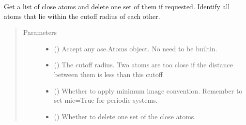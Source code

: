\documentclass[letterpaper,10pt,english]{sphinxmanual}
\begin{document}
\begin{fulllineitems}
\label{\detokenize{utilities:acat.utilities.get_close_atoms}}
Get a list of close atoms and delete one set of them if requested.
Identify all atoms that lie within the cutoff radius of each other.
\begin{quote}\begin{description}
\item[{Parameters}] \leavevmode\begin{itemize}
\item {} 
 () \textendash{} Accept any ase.Atoms object. No need to be built\sphinxhyphen{}in.

\item {} 
 (\sphinxstyleliteralemphasis{\sphinxupquote{, }}) \textendash{} The cutoff radius. Two atoms are too close if the distance between
them is less than this cutoff

\item {} 
 (\sphinxstyleliteralemphasis{\sphinxupquote{, }}) \textendash{} Whether to apply minimum image convention. Remember to set
mic=True for periodic systems.

\item {} 
 (\sphinxstyleliteralemphasis{\sphinxupquote{, }}) \textendash{} Whether to delete one set of the close atoms.

\end{itemize}

\end{description}\end{quote}

\end{fulllineitems}
\end{document}
